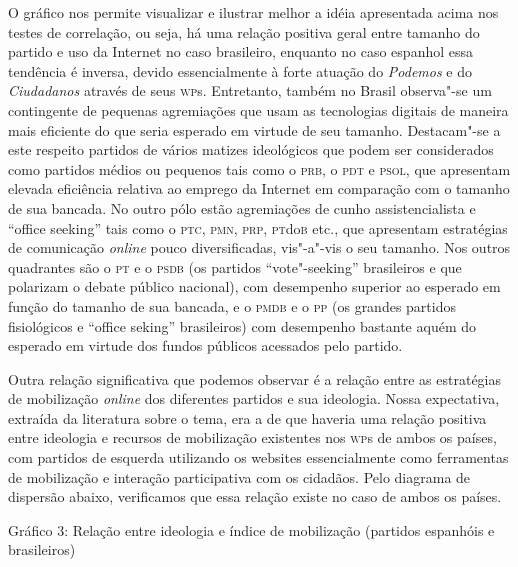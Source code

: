 O gráfico nos permite visualizar e ilustrar melhor a idéia apresentada
acima nos testes de correlação, ou seja, há uma relação positiva geral
entre tamanho do partido e uso da Internet no caso brasileiro, enquanto
no caso espanhol essa tendência é inversa, devido essencialmente à forte
atuação do \emph{Podemos} e do \emph{Ciudadanos} através de seus \textsc{wp}s.
Entretanto, também no Brasil observa"-se um contingente de pequenas
agremiações que usam as tecnologias digitais de maneira mais eficiente
do que seria esperado em virtude de seu tamanho. Destacam"-se a este
respeito partidos de vários matizes ideológicos que podem ser
considerados como partidos médios ou pequenos tais como o \textsc{prb}, o \textsc{pdt} e
\textsc{psol}, que apresentam elevada eficiência relativa ao emprego da Internet
em comparação com o tamanho de sua bancada. No outro pólo estão
agremiações de cunho assistencialista e ``office seeking'' tais como o
\textsc{ptc}, \textsc{pmn}, \textsc{prp}, \textsc{pt}do\textsc{b} etc., que apresentam estratégias de comunicação
\emph{online} pouco diversificadas, vis"-a"-vis o seu tamanho. Nos outros
quadrantes são o \textsc{pt} e o \textsc{psdb} (os partidos ``vote"-seeking'' brasileiros e
que polarizam o debate público nacional), com desempenho superior ao
esperado em função do tamanho de sua bancada, e o \textsc{pmdb} e o \textsc{pp} (os
grandes partidos fisiológicos e ``office seking'' brasileiros) com
desempenho bastante aquém do esperado em virtude dos fundos públicos
acessados pelo partido.

Outra relação significativa que podemos observar é a relação entre as
estratégias de mobilização \emph{online} dos diferentes partidos e sua
ideologia. Nossa expectativa, extraída da literatura sobre o tema, era a
de que haveria uma relação positiva entre ideologia e recursos de
mobilização existentes nos \textsc{wp}s de ambos os países, com partidos de
esquerda utilizando os websites essencialmente como ferramentas de
mobilização e interação participativa com os cidadãos. Pelo diagrama de
dispersão abaixo, verificamos que essa relação existe no caso de ambos
os países.

\pagebreak

\begin{center}
Gráfico 3: Relação entre ideologia e índice de mobilização (partidos
espanhóis e brasileiros)
\end{center}


